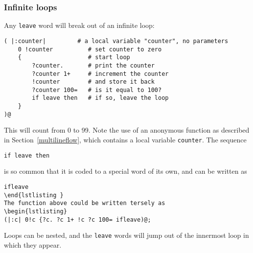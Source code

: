 \subsubsection{Infinite loops}
Any \texttt{leave} word will break out of an infinite loop:
\begin{lstlisting}
( |:counter|         # a local variable "counter", no parameters
    0 !counter          # set counter to zero
    {                   # start loop
        ?counter.       # print the counter
        ?counter 1+     # increment the counter
        !counter        # and store it back
        ?counter 100=   # is it equal to 100?
        if leave then   # if so, leave the loop
    }
)@
\end{lstlisting}
This will count from 0 to 99. Note the use of an anonymous function
as described in Section~\ref{multilineflow}, which contains a local
variable \texttt{counter}.
The sequence
\begin{lstlisting}
if leave then
\end{lstlisting}
is so common that it is coded to a special word of its own, and can be written
as 
\begin{lstlisting}
ifleave
\end{lstlisting }
The function above could be written tersely as
\begin{lstlisting}
(|:c| 0!c {?c. ?c 1+ !c ?c 100= ifleave)@;
\end{lstlisting}
Loops can be nested, and the \texttt{leave} words will jump out of the
innermost loop in which they appear.

